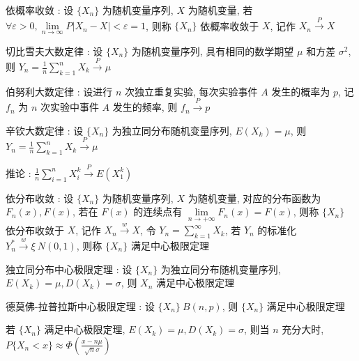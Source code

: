 \documentclass[UTF8, 12pt]{ctexart}
\begin{document}
	依概率收敛 : 设 $ \{X_{n}\} $ 为随机变量序列, $ X $ 为随机变量, 若 $ \forall \varepsilon > 0, \lim\limits_{n \to \infty}P{|X_{n}-X| < \varepsilon} = 1 $, 则称 $ \{X_{n}\} $ 依概率收敛于 $ X $, 
	记作 $ X_{n} \overset{P}{\to} X $

	切比雪夫大数定律 : 设 $ \{X_{n}\} $ 为随机变量序列, 具有相同的数学期望 $ \mu $ 和方差 $ \sigma^{2} $, 则 $ Y_{n} = \frac{1}{n}\sum\limits_{k=1}^{n}X_{k} \overset{P}{\to} \mu $

	伯努利大数定律 : 设进行 $ n $ 次独立重复实验, 每次实验事件 $ A $ 发生的概率为 $ p $, 记 $ f_{n} $ 为 $ n $ 次实验中事件 $ A $ 发生的频率, 则 $ f_{n} \overset{P}{\to} p $

	辛钦大数定律 : 设 $ \{X_{n}\} $ 为独立同分布随机变量序列, $ E(X_{k}) = \mu $, 则 $ Y_{n} = \frac{1}{n}\sum\limits_{k=1}^{n}X_{k} \overset{P}{\to} \mu $

	推论 : $ \frac{1}{n}\sum\limits_{i=1}^{n}X_{i}^{k} \overset{P}{\to} E(X_{1}^{k}) $

	依分布收敛 : 设 $ \{X_{n}\} $ 为随机变量序列, $ X $ 为随机变量, 对应的分布函数为 $ F_{n}(x), F(x) $, 若在 $ F(x) $ 的连续点有 $ \lim\limits_{n \to +\infty}F_{n}(x) = F(x) $, 则称 $ \{X_{n}\} $ 依分布收敛于 $ X $, 
	记作 $ X_{n} \overset{w}{\to} X $, 令 $ Y_{n} = \sum\limits_{k=1}^{\infty}X_{k} $, 若 $ Y_{n} $ 的标准化 $ Y_{n}^{*} \overset{w}{\to} \xi ~ N(0, 1) $, 则称  $ \{X_{n}\} $ 满足中心极限定理

	独立同分布中心极限定理 : 设 $ \{X_{n}\} $ 为独立同分布随机变量序列, $ E(X_{k}) = \mu, D(X_{k}) = \sigma $, 则 $ X_{n} $ 满足中心极限定理

	德莫佛-拉普拉斯中心极限定理 : 设 $ \{X_{n}\} ~ B(n, p) $, 则 $ \{X_{n}\} $ 满足中心极限定理

	若 $ \{X_{n}\} $ 满足中心极限定理, $ E(X_{k}) = \mu, D(X_{k}) = \sigma $, 则当 $ n $ 充分大时, $ P\{X_{n} < x\} \approx \Phi(\frac{x-n\mu}{\sqrt{n}\sigma}) $ 
\end{document}
